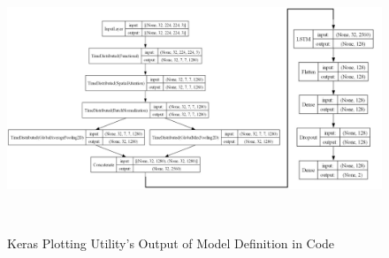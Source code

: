 \begin{figure}[htbp!]
    \centering
    \includegraphics[width=0.99\linewidth]{Images/our_model.jpg}
    \caption{Keras Plotting Utility's Output of Model Definition in Code}\
    \label{KerasBlockDiagram}
\end{figure}

\vspace{-10mm}


